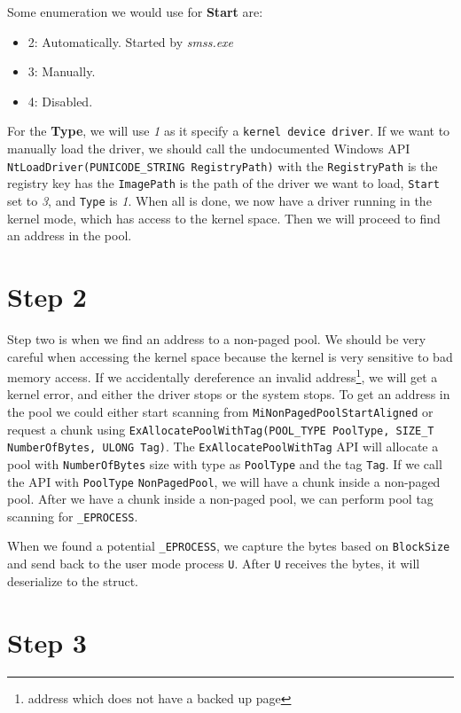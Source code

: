 Some enumeration we would use for \textbf{Start} are:

\begin{itemize}
  \item 2: Automatically. Started by \textit{smss.exe}
  \item 3: Manually.
  \item 4: Disabled.
\end{itemize}

For the \textbf{Type}, we will use \textit{1} as it specify a \texttt{kernel device driver}. If we want to manually load the driver, we should call the undocumented Windows API \texttt{NtLoadDriver(PUNICODE\_STRING RegistryPath)} with the \texttt{RegistryPath} is the registry key has the \texttt{ImagePath} is the path of the driver we want to load, \texttt{Start} set to \textit{3}, and \texttt{Type} is \textit{1}. When all is done, we now have a driver running in the kernel mode, which has access to the kernel space. Then we will proceed to find an address in the pool.

\section[Step 2]{Step 2}

Step two is when we find an address to a non-paged pool. We should be very careful when accessing the kernel space because the kernel is very sensitive to bad memory access. If we accidentally dereference an invalid address\footnote{address which does not have a backed up page}, we will get a kernel error, and either the driver stops or the system stops. To get an address in the pool we could either start scanning from \texttt{MiNonPagedPoolStartAligned} or request a chunk using \texttt{ExAllocatePoolWithTag(POOL\_TYPE PoolType, SIZE\_T NumberOfBytes, ULONG Tag)}. The \texttt{ExAllocatePoolWithTag} API will allocate a pool with \texttt{NumberOfBytes} size with type as \texttt{PoolType} and the tag \texttt{Tag}. If we call the API with \texttt{PoolType} \texttt{NonPagedPool}, we will have a chunk inside a non-paged pool. After we have a chunk inside a non-paged pool, we can perform pool tag scanning for \texttt{\_EPROCESS}.

When we found a potential \texttt{\_EPROCESS}, we capture the bytes based on \texttt{BlockSize} and send back to the user mode process \texttt{U}. After \texttt{U} receives the bytes, it will deserialize to the struct.

\section[Step 3]{Step 3}

